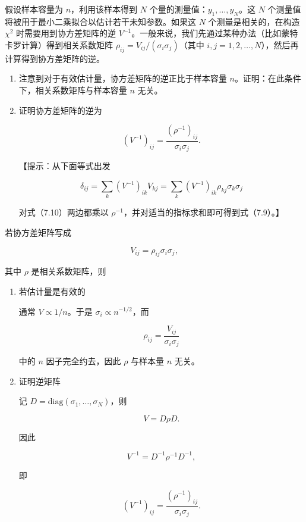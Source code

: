 \begin{question}
假设样本容量为 \(n\)，利用该样本得到 \(N\)
个量的测量值：\(y_1,\ldots,y_N\)。这 \(N\)
个测量值将被用于最小二乘拟合以估计若干未知参数。如果这 \(N\)
个测量是相关的，在构造 \(\chi^2\) 时需要用到协方差矩阵的逆
\(V^{-1}\)。一般来说，我们先通过某种办法（比如蒙特卡罗计算）得到相关系数矩阵
\(\rho_{ij}=V_{ij}/(\sigma_i\sigma_j)\)（其中
\(i,j=1,2,\ldots,N\)），然后再计算得到协方差矩阵的逆。

\begin{enumerate}
\item 注意到对于有效估计量，协方差矩阵的逆正比于样本容量
\(n\)。证明：在此条件下，相关系数矩阵与样本容量 \(n\) 无关。

\item 证明协方差矩阵的逆为

\[
(V^{-1})_{ij}=\frac{(\rho^{-1})_{ij}}{\sigma_i\sigma_j}.
\]

【提示：从下面等式出发

\[
\delta_{ij}=\sum_k(V^{-1})_{ik}V_{kj}=\sum_k(V^{-1})_{ik}\rho_{kj}\sigma_k\sigma_j
\]

对式（7.10）两边都乘以
\(\rho^{-1}\)，并对适当的指标求和即可得到式（7.9）。】
\end{enumerate}
\begin{solution}
若协方差矩阵写成

\[
V_{ij}=\rho_{ij}\sigma_i\sigma_j,
\]

其中 \(\rho\) 是相关系数矩阵，则

\begin{enumerate}
\item 若估计量是有效的

通常 \(V\propto 1/n\)。于是 \(\sigma_i\propto n^{-1/2}\)，而

\[
\rho_{ij}=\frac{V_{ij}}{\sigma_i\sigma_j}
\]

中的 \(n\) 因子完全约去，因此 \(\rho\) 与样本量 \(n\) 无关。

\item 证明逆矩阵

记 \(D=\mathrm{diag}(\sigma_1,\dots,\sigma_N)\)，则

\[
V=D\rho D.
\]

因此

\[
V^{-1}=D^{-1}\rho^{-1}D^{-1},
\]

即

\[
(V^{-1})_{ij}=\frac{(\rho^{-1})_{ij}}{\sigma_i\sigma_j}.
\]
\end{enumerate}
\end{solution}
\end{question}


